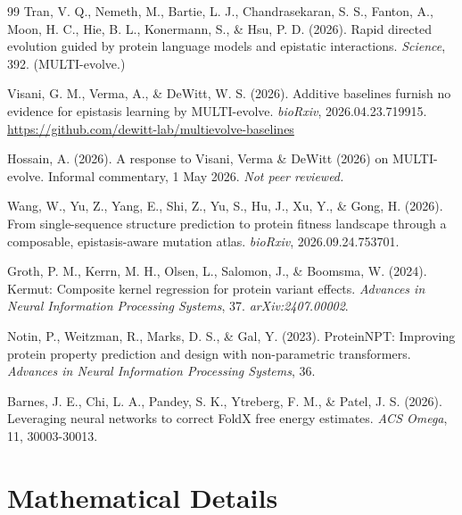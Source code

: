 \documentclass[12pt, a4paper]{article}
\begin{document}
\begin{thebibliography}{99}
Tran, V. Q., Nemeth, M., Bartie, L. J., Chandrasekaran, S. S., Fanton, A., Moon, H. C., Hie, B. L., Konermann, S., \& Hsu, P. D. (2026). \newblock Rapid directed evolution guided by protein language models and epistatic interactions. \newblock \textit{Science}, 392. (MULTI-evolve.)


Visani, G. M., Verma, A., \& DeWitt, W. S. (2026). \newblock Additive baselines furnish no evidence for epistasis learning by MULTI-evolve. \newblock \textit{bioRxiv}, 2026.04.23.719915. \url{https://github.com/dewitt-lab/multievolve-baselines}


Hossain, A. (2026). \newblock A response to Visani, Verma \& DeWitt (2026) on MULTI-evolve. \newblock Informal commentary, 1 May 2026. \textit{Not peer reviewed.}


Wang, W., Yu, Z., Yang, E., Shi, Z., Yu, S., Hu, J., Xu, Y., \& Gong, H. (2026). \newblock From single-sequence structure prediction to protein fitness landscape through a composable, epistasis-aware mutation atlas. \newblock \textit{bioRxiv}, 2026.09.24.753701.


Groth, P. M., Kerrn, M. H., Olsen, L., Salomon, J., \& Boomsma, W. (2024). \newblock Kermut: Composite kernel regression for protein variant effects. \newblock \textit{Advances in Neural Information Processing Systems}, 37. \textit{arXiv:2407.00002}.


Notin, P., Weitzman, R., Marks, D. S., \& Gal, Y. (2023). \newblock ProteinNPT: Improving protein property prediction and design with non-parametric transformers. \newblock \textit{Advances in Neural Information Processing Systems}, 36.


Barnes, J. E., Chi, L. A., Pandey, S. K., Ytreberg, F. M., \& Patel, J. S. (2026). \newblock Leveraging neural networks to correct FoldX free energy estimates. \newblock \textit{ACS Omega}, 11, 30003-30013.

\end{thebibliography}


\newpage
\appendix

\section{Mathematical Details}
\label{app:equations}
\end{document}
